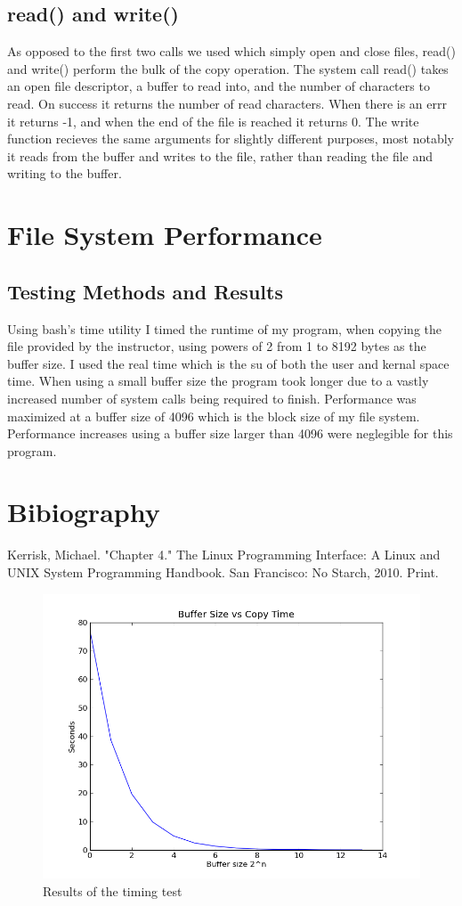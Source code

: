 \documentclass[letterpaper,10pt,twocolumn,titlepage]{article}
\begin{document}
\subsection{read() and write()}
As opposed to the first two calls we used which simply open and close files, read() and write() perform the bulk of the copy operation. The system call read() takes an open file descriptor, a buffer to read into, and the number of characters to read. On success it returns the number of read characters. When there is an errr it returns -1, and when the end of the file is reached it returns 0. The write function recieves the same arguments for slightly different purposes, most notably it reads from the buffer and writes to the file, rather than reading the file and writing to the buffer.

\newline
\newline

\section{File System Performance}
\subsection{Testing Methods and Results}
Using bash's time utility I timed the runtime of my program, when copying the file provided by the instructor, using powers of 2 from 1 to 8192 bytes as the buffer size. I used the real time which is the su of both the user and kernal space time. When using a small buffer size the program took longer due to a vastly increased number of system calls being required to finish. Performance was maximized at a buffer size of 4096 which is the block size of my file system. Performance increases using a buffer size larger than 4096 were neglegible for this program.

\newline
\newline

\section{Bibiography}
Kerrisk, Michael. "Chapter 4." The Linux Programming Interface: A Linux and UNIX System Programming Handbook. San Francisco: No Starch, 2010. Print.

\begin{figure}[h]
  \caption{Results of the timing test}
  \centering
    \includegraphics[width=.75\textwidth]{copy_times.png}
\end{figure}
\end{document}
